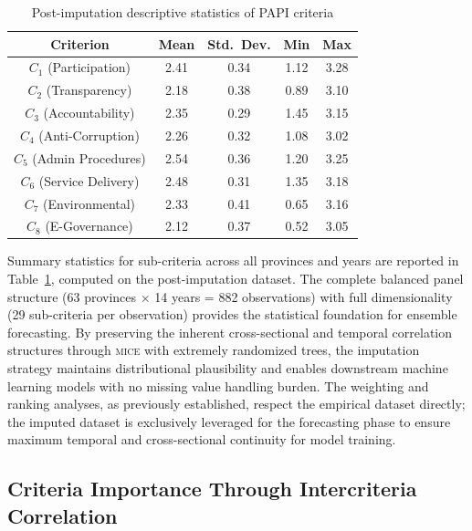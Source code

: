 \documentclass[12pt,a4paper]{article}
\newcommand{\MICE}{\textsc{mice}\xspace}
\begin{document}
\begin{table}[!ht]
\centering
\caption{Post-imputation descriptive statistics of PAPI criteria}
\label{tab:descriptive}
\small
\begin{tabular}{c c c c c}
\toprule
\textbf{Criterion} & \textbf{Mean} & \textbf{Std.\ Dev.} & \textbf{Min} & \textbf{Max} \\
\midrule
$C_1$ (Participation) & 2.41 & 0.34 & 1.12 & 3.28 \\
$C_2$ (Transparency) & 2.18 & 0.38 & 0.89 & 3.10 \\
$C_3$ (Accountability) & 2.35 & 0.29 & 1.45 & 3.15 \\
$C_4$ (Anti-Corruption) & 2.26 & 0.32 & 1.08 & 3.02 \\
$C_5$ (Admin Procedures) & 2.54 & 0.36 & 1.20 & 3.25 \\
$C_6$ (Service Delivery) & 2.48 & 0.31 & 1.35 & 3.18 \\
$C_7$ (Environmental) & 2.33 & 0.41 & 0.65 & 3.16 \\
$C_8$ (E-Governance) & 2.12 & 0.37 & 0.52 & 3.05 \\
\bottomrule
\end{tabular}
\end{table}

Summary statistics for sub-criteria across all provinces and years are reported in Table~\ref{tab:descriptive}, computed on the post-imputation dataset. The complete balanced panel structure (63 provinces $\times$ 14 years = 882 observations) with full dimensionality (29 sub-criteria per observation) provides the statistical foundation for ensemble forecasting. By preserving the inherent cross-sectional and temporal correlation structures through \MICE with extremely randomized trees, the imputation strategy maintains distributional plausibility and enables downstream machine learning models with no missing value handling burden. The weighting and ranking analyses, as previously established, respect the empirical dataset directly; the imputed dataset is exclusively leveraged for the forecasting phase to ensure maximum temporal and cross-sectional continuity for model training.

\subsection{Criteria Importance Through Intercriteria Correlation}
\label{subsec:critic}

\end{document}
